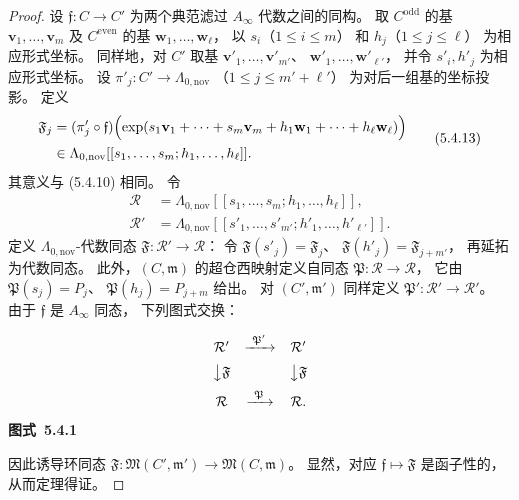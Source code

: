 \begin{proof}
设 $\mathfrak f\colon C\to C'$
为两个典范滤过 $A_\infty$
代数之间的同构。
取 $C^{\mathrm{odd}}$ 的基
$\mathbf v_1,\ldots,\mathbf v_m$
及 $C^{\mathrm{even}}$ 的基
$\mathbf w_1,\ldots,\mathbf w_\ell$，
以 $s_i$（$1\le i\le m$）
和 $h_j$（$1\le j\le\ell$）
为相应形式坐标。
同样地，对 $C'$ 取基
$\mathbf v'_1,\ldots,\mathbf v'_{m'}$、
$\mathbf w'_1,\ldots,\mathbf w'_{\ell'}$，
并令 $s'_i,h'_j$
为相应形式坐标。
设
$\pi'_j\colon C'\to
\Lambda_{0,\mathrm{nov}}$
（$1\le j\le m'+\ell'$）
为对后一组基的坐标投影。
定义
\begin{equation}
\begin{aligned}
\mathfrak F_j
&=
(\pi'_j\circ\mathfrak f)
\Bigl(
\exp(
s_1\mathbf v_1+\cdots+s_m\mathbf v_m
+h_1\mathbf w_1+\cdots+h_\ell\mathbf w_\ell
)
\Bigr)\\
&\in
\Lambda_{0,\mathrm{nov}}
[[s_1,\ldots,s_m;h_1,\ldots,h_\ell]].
\end{aligned}
\tag{5.4.13}\label{eq:5-4-13}
\end{equation}
其意义与 (5.4.10) 相同。
令
\[
\begin{aligned}
\mathcal R
&=\Lambda_{0,\mathrm{nov}}
[[s_1,\ldots,s_m;h_1,\ldots,h_\ell]],\\
\mathcal R'
&=\Lambda_{0,\mathrm{nov}}
[[s'_1,\ldots,s'_{m'};
h'_1,\ldots,h'_{\ell'}]].
\end{aligned}
\]
定义 $\Lambda_{0,\mathrm{nov}}$-代数同态
$\mathfrak F\colon\mathcal R'\to\mathcal R$：
令
$\mathfrak F(s'_j)=\mathfrak F_j$、
$\mathfrak F(h'_j)=\mathfrak F_{j+m'}$，
再延拓为代数同态。
此外，$(C,\mathfrak m)$
的超仓西映射定义自同态
$\mathfrak P\colon\mathcal R\to\mathcal R$，
它由
$\mathfrak P(s_j)=P_j$、
$\mathfrak P(h_j)=P_{j+m}$
给出。
对 $(C',\mathfrak m')$
同样定义
$\mathfrak P'\colon\mathcal R'\to\mathcal R'$。
由于 $\mathfrak f$ 是
$A_\infty$ 同态，
下列图式交换：
\begin{center}
\[
\begin{array}{ccc}
\mathcal R'
&\xrightarrow{\ \mathfrak P'\ }&
\mathcal R'\\[2mm]
\big\downarrow{\mathfrak F}
&&\big\downarrow{\mathfrak F}\\[2mm]
\mathcal R
&\xrightarrow{\ \mathfrak P\ }&
\mathcal R .
\end{array}
\]
\renewcommand{\thefigure}{5.4.1}
{\normalfont\bfseries 图式~\thefigure}
\label{diag:5-4-1}
\end{center}
因此诱导环同态
$\mathfrak F\colon
\mathfrak M(C',\mathfrak m')
\to\mathfrak M(C,\mathfrak m)$。
显然，对应
$\mathfrak f\mapsto\mathfrak F$
是函子性的，
从而定理得证。
\end{proof}

